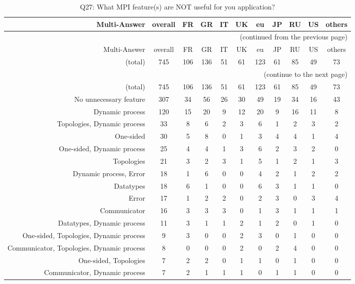 \clearpage%
{\footnotesize\begin{landscape}%
\begin{longtable}[htb]{r|c|c|c|c|c|c|c|c|c|c}%
\caption{Q27: What MPI feature(s) are NOT useful for you application?}%
\label{tab:Q27-mans} \\%
\hline%
Multi-Answer & overall & FR & GR & IT & UK & eu & JP & RU & US & others \\
 \hline%
\endfirsthead%
\multicolumn{11}{r}{(continued from the previous page)}\\%
\hline%
Multi-Answer & overall & FR & GR & IT & UK & eu & JP & RU & US & others \\
 \hline%
\endhead%
\hline%
(total) & 745 & 106 & 136 & 51 & 61 & 123 & 61 & 85 & 49 & 73 \\%
\hline%
\multicolumn{11}{r}{(continue to the next page)}\\%
\endfoot%
\hline%
(total) & 745 & 106 & 136 & 51 & 61 & 123 & 61 & 85 & 49 & 73 \\%
\hline%
\endlastfoot%
\hline%
{No unnecessary feature} & 307 & 34 & 56 & 26 & 30 & 49 & 19 & 34 & 16 & 43 \\%
{Dynamic process} & 120 & 15 & 20 & 9 & 12 & 20 & 9 & 16 & 11 & 8 \\%
{Topologies, Dynamic process} & 33 & 8 & 6 & 2 & 3 & 6 & 1 & 2 & 3 & 2 \\%
{One-sided} & 30 & 5 & 8 & 0 & 1 & 3 & 4 & 4 & 1 & 4 \\%
{One-sided, Dynamic process} & 25 & 4 & 4 & 1 & 3 & 6 & 2 & 3 & 2 & 0 \\%
{Topologies} & 21 & 3 & 2 & 3 & 1 & 5 & 1 & 2 & 1 & 3 \\%
{Dynamic process, Error} & 18 & 1 & 6 & 0 & 0 & 4 & 2 & 1 & 2 & 2 \\%
{Datatypes} & 18 & 6 & 1 & 0 & 0 & 6 & 3 & 1 & 1 & 0 \\%
{Error} & 17 & 1 & 2 & 2 & 0 & 2 & 3 & 0 & 3 & 4 \\%
{Communicator} & 16 & 3 & 3 & 3 & 0 & 1 & 3 & 1 & 1 & 1 \\%
{Datatypes, Dynamic process} & 11 & 3 & 1 & 1 & 2 & 1 & 2 & 0 & 1 & 0 \\%
{One-sided, Topologies, Dynamic process} & 9 & 3 & 0 & 0 & 2 & 3 & 0 & 1 & 0 & 0 \\%
{Communicator, Topologies, Dynamic process} & 8 & 0 & 0 & 0 & 2 & 0 & 2 & 4 & 0 & 0 \\%
{One-sided, Topologies} & 7 & 2 & 2 & 0 & 1 & 1 & 0 & 1 & 0 & 0 \\%
{Communicator, Dynamic process} & 7 & 2 & 1 & 1 & 1 & 0 & 1 & 1 & 0 & 0 \\%

\end{longtable}
\end{landscape}}
